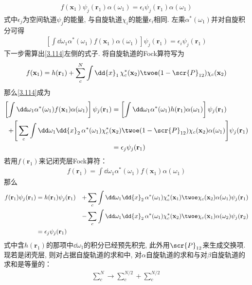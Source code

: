 \begin{align}\label{3.113}
	f(\mathbf{x}_1)\psi_j(\mathbf{r}_1)\alpha(\omega_1) = \epsilon_i\psi_j(\mathbf{r}_1)\alpha(\omega_1)
\end{align}
式中$\epsilon_j$为空间轨道$\psi_j$的能量, 
与自旋轨道$\chi_i$的能量$\epsilon_i$相同. 
左乘$\alpha^*(\omega_1)$并对自旋积分可得
\begin{align}
	\label{3.114}
	\left[ \int\dd\omega_1\alpha^*(\omega_1)f(\mathbf{x}_1)\alpha(\omega_1) \right]\psi_j(\mathbf{r}_1) = \epsilon_i\psi_j(\mathbf{r}_1)
\end{align}
下一步需算出\autoref{3.114}左侧的式子. 
将自旋轨道的Fock算符写为
\begin{align}\label{3.115}
	f(\mathbf{x}_1) = h(\mathbf{r}_1) + \sum_c^N\int\dd{x}_1\,\chi_c^*(\mathbf{x}_2)\twoe(1-\scr{P}_{12})\chi_c(\mathbf{x}_2)
\end{align}
那么\autoref{3.114}成为
\begin{align}
	\left[ \int\dd\omega_1\alpha^*(\omega_1)f(\mathbf{x}_1)\alpha(\omega_1) \right]\psi_j(\mathbf{r}_1) &= \left[ \int\dd\omega_1\alpha^*(\omega_1)h(\mathbf{r}_1)\alpha(\omega_1) \right]\psi_j(\mathbf{r}_1) \notag\\
	+\Bigg[ \sum_c\int\dd\omega_1\dd{x}_2\,\alpha^*(\omega_1)\chi_c^*(&\mathbf{x}_2)\twoe(1-\scr{P}_{12})\chi_c(\mathbf{x}_2)\alpha(\omega_1) \Bigg]\psi_j(\mathbf{r}_1)  \notag\\
	& = \epsilon_j\psi_j(\mathbf{r}_1)
\end{align}
若用$f(\mathbf{r}_1)$来记闭壳层Fock算符：
\begin{align}
	f(\mathbf{r}_1) = \int\dd\omega_1\alpha^*(\omega_1)f(\mathbf{x}_1)\alpha(\omega_1)
\end{align}
那么
\begin{alignat}{3}
	f(\mathbf{r}_1)\psi_j(\mathbf{r}_1) &= h(\mathbf{r}_1)\psi_j(\mathbf{r}_1) &+ \sum_c\int\dd\omega_1\dd{x}_2\,\alpha^*(\omega_1)\chi_c^*(\mathbf{x}_1)\twoe\chi_c(\mathbf{x}_2)\alpha(\omega_1)\psi_j(\mathbf{r}_1)\notag\\
	&&-\sum_c\int\dd\omega_1\dd{x}_2\,\alpha^*(\omega_1)\chi_c^*(\mathbf{x}_2)\twoe\chi_c(\mathbf{x}_1)\alpha(\omega_2)\psi_j(\mathbf{r}_2)\notag\\
	&=\epsilon_j\psi_j(\mathbf{r}_1)&
\end{alignat}
式中含$h(\mathbf{r}_1)$的那项中$\dd\omega_1$的积分已经预先积完, 
此外用$\scr{P}_{12}$来生成交换项. 
现若是闭壳层, 
则对占据自旋轨道的求和中, 
对$\alpha$自旋轨道的求和与对$\beta$自旋轨道的求和是等量的：
\begin{align}
	\sum_c^N\to \sum_c^{N/2} + \sum_c^{N/2}
\end{align}
